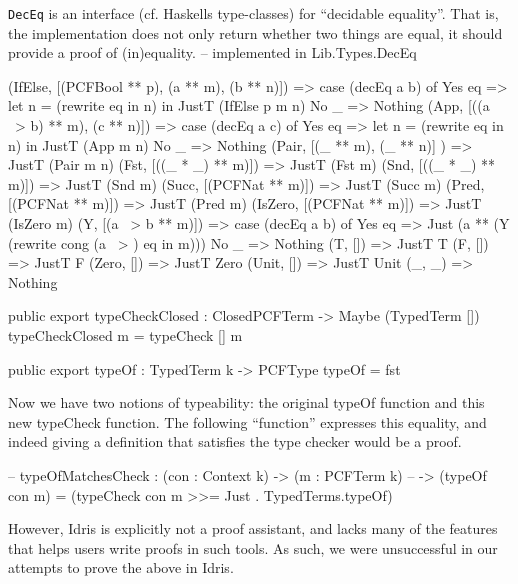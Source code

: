 \lstinline{DecEq} is an interface (cf. Haskells type-classes) for ``decidable equality''.
That is, the implementation does not only return whether two things are equal, it should provide a proof of (in)equality.
-- implemented in Lib.Types.DecEq

\begin{code}
  (IfElse,  [(PCFBool ** p), (a ** m), (b ** n)]) 
      => case (decEq a b) of
            Yes eq => let n = (rewrite eq in n) in JustT (IfElse p m n)
            No  _  => Nothing
  (App,     [((a ~> b) ** m), (c ** n)])
      => case (decEq a c) of
            Yes eq => let n = (rewrite eq in n) in JustT (App m n)
            No  _  => Nothing
  (Pair,    [(_ ** m), (_ ** n)] )  => JustT (Pair m n)
  (Fst,     [((_ * _) ** m)])       => JustT (Fst m)
  (Snd,     [((_ * _) ** m)])       => JustT (Snd m)
  (Succ,    [(PCFNat ** m)])        => JustT (Succ m)
  (Pred,    [(PCFNat ** m)])        => JustT (Pred m)
  (IsZero,  [(PCFNat ** m)])        => JustT (IsZero m)
  (Y,       [(a ~> b ** m)])        => case (decEq a b) of
                                          Yes eq => Just (a ** (Y (rewrite cong (a ~> ) eq in m)))
                                          No  _  => Nothing
  (T,       [])                     => JustT T
  (F,       [])                     => JustT F
  (Zero,    [])                     => JustT Zero
  (Unit,    [])                     => JustT Unit
  (_, _)                            => Nothing
\end{code}

\begin{code}
public export
typeCheckClosed : ClosedPCFTerm -> Maybe (TypedTerm [])
typeCheckClosed m = typeCheck [] m
\end{code}

\begin{code}
public export
typeOf : TypedTerm k -> PCFType
typeOf = fst
\end{code}


Now we have two notions of typeability: the original typeOf function and this new typeCheck function.
The following ``function'' expresses this equality, and indeed giving a definition that satisfies the type checker would be a proof.
\begin{code}
-- typeOfMatchesCheck : (con : Context k) -> (m : PCFTerm k) 
--                        -> (typeOf con m) = (typeCheck con m >>= Just . TypedTerms.typeOf)
\end{code}
However, Idris is explicitly not a proof assistant, and lacks many of the features that helps users write proofs in such tools.
As such, we were unsuccessful in our attempts to prove the above in Idris.

